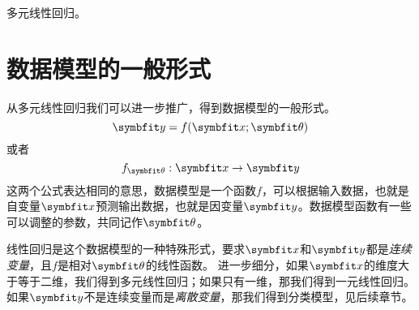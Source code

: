 \begin{example}
    多元线性回归。
\end{example}

\section{数据模型的一般形式}

从多元线性回归我们可以进一步推广，得到数据模型的一般形式。
\begin{equation}
    \Vy=f(\Vx;\Vtheta)
\end{equation}
或者
\begin{equation}
    f_{\Vtheta}:\Vx\to\Vy
\end{equation}
这两个公式表达相同的意思，数据模型是一个函数$f$，可以根据输入数据，也就是自变量$\Vx$预测输出数据，也就是因变量$\Vy$。数据模型函数有一些可以调整的参数，共同记作$\Vtheta$。

线性回归是这个数据模型的一种特殊形式，要求$\Vx$和$\Vy$都是\emph{连续变量}，且$f$是相对$\Vtheta$的线性函数。
进一步细分，如果$\Vx$的维度大于等于二维，我们得到多元线性回归；如果只有一维，那我们得到一元线性回归。
如果$\Vy$不是连续变量而是\emph{离散变量}，那我们得到分类模型，见后续章节。